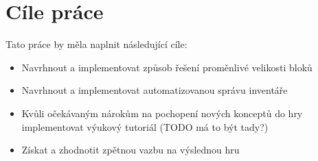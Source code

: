 \section{Cíle práce}
Tato práce by měla naplnit následující cíle:
\begin{itemize}
	\item Navrhnout a implementovat způsob řešení proměnlivé velikosti bloků
	\item Navrhnout a implementovat automatizovanou správu inventáře
	\item Kvůli očekávaným nárokům na pochopení nových konceptů do hry implementovat výukový tutoriál (TODO má to být tady?)
	\item Získat a zhodnotit zpětnou vazbu na výslednou hru
\end{itemize}

